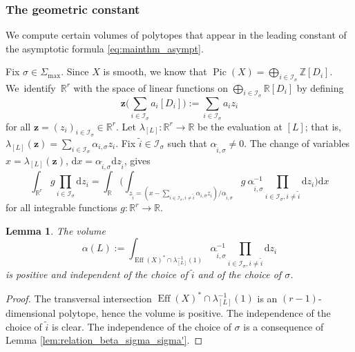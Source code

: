 \documentclass[JEP,XML,SOM,Unicode,published]{cedram}
\newcommand{\bfz}{\boldsymbol{z}}
\newcommand\ZZ{\mathbb{Z}}
\newcommand\RR{\mathbb{R}}
\newcommand{\ic}[1]{\mathcal{I}_{#1}}
\DeclareMathOperator{\pic}{Pic}
\DeclareMathOperator{\eff}{Eff}
\newtheorem{lemma}[theorem]{Lemma}
\theoremstyle{definition}
\numberwithin{theorem}{section}
\begin{document}
\subsubsection{The geometric constant}
We compute certain volumes of polytopes that appear in the leading constant
of the asymptotic formula \eqref{eq:mainthm_asympt}.

Fix $\sigma\in\Sigma_{\max}$.
Since $X$ is smooth, we know that $\pic(X)=\bigoplus_{i\in\ic{\sigma}}\ZZ[D_i]$.
We~iden\-ti\-fy~$\RR^r$ with the space of linear functions on
$\bigoplus_{i\in\ic{\sigma}}\RR[D_{i}]$ by defining
\[
\bfz\biggl (\sum_{i\in\ic{\sigma}}a_i[D_{i}]\biggr):=\sum_{i\in\ic{\sigma}}a_iz_i
\]
for all $\bfz=(z_i)_{i\in\ic{\sigma}}\in\RR^r$.
Let $\lambda_{[L]}:\RR^r\to\RR$ be the evaluation at $[L]$;
that is, $\lambda_{[L]}(\bfz)=\sum_{i\in\ic{\sigma}}\alpha_{i,\sigma} z_i$.
Fix $\tilde i\in\ic{\sigma}$ such that $\alpha_{\tilde i,\sigma}\neq0$.
The change of variables $x=\lambda_{[L]}(\bfz)$,
$\mathrm d x=\alpha_{\tilde i,\sigma}\mathrm d z_{\tilde i}$, gives
\[
\int_{\RR^r} g\prod_{i\in\ic{\sigma}}\mathrm d z_i=
\int_\RR\biggl (
\int_{z_{\tilde i}=\left (x-\sum_{i\in\ic{\sigma}, i\neq\tilde i}\alpha_{i,\sigma} z_i \right)/\alpha_{\tilde i,\sigma}}
g\ \alpha_{\tilde i,\sigma}^{-1}\prod_{i\in\ic{\sigma}, i\neq\tilde i}\mathrm dz_i\biggr)\mathrm d x
\]
for all integrable functions $g:\RR^r\to \RR$.
\begin{lemma}
\label{lem:alpha_peyre}
The volume
\[
\alpha(L):=
\int_{\eff(X)^*\cap \lambda_{[L]}^{-1}(1)}
\alpha_{\tilde i,\sigma}^{-1}\prod_{i\in \ic{\sigma}, i\neq\tilde i}\mathrm dz_i
\]
is positive and independent of the choice of $\tilde i$ and of the choice of $\sigma$.
\end{lemma}
\begin{proof}
The transversal intersection $\eff(X)^*\cap \lambda_{[L]}^{-1}(1)$
is an $(r-1)$-dimensional polytope, hence the volume is positive.
The independence of the choice of $\tilde i$ is clear.
The independence of the choice of $\sigma$ is a consequence of
Lemma \ref{lem:relation_beta_sigma_sigma'}.
\end{proof}
\end{document}
